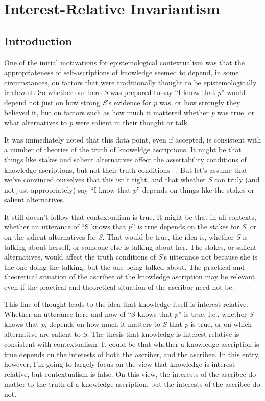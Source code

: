 \chapter{Interest-Relative Invariantism}

\section{Introduction}
\label{introduction}

One of the initial motivations for epistemological contextualism was that the appropriateness of self-ascriptions of knowledge seemed to depend, in some circumstances, on factors that were traditionally thought to be epistemologically irrelevant. So whether our hero \emph{S} was prepared to say ``I know that \emph{p}'' would depend not just on how strong \emph{S}'s evidence for \emph{p} was, or how strongly they believed it, but on factors such as how much it mattered whether \emph{p} was true, or what alternatives to \emph{p} were salient in their thought or talk.

It was immediately noted that this data point, even if accepted, is consistent with a number of theories of the truth of knoweldge ascriptions. It might be that things like stakes and salient alternatives affect the assertability conditions of knowledge ascriptions, but not their truth conditions ~\citep{Rysiew2016}. But let's assume that we've convinced ourselves that this isn't right, and that whether \emph{S} can truly (and not just appropriately) say ``I know that \emph{p}'' depends on things like the stakes or salient alternatives.

It still doesn't follow that contextualism is true. It might be that in all contexts, whether an utterance of ``S knows that \emph{p}'' is true depends on the stakes for \emph{S}, or on the salient alternatives for \emph{S}. That would be true, the idea is, whether \emph{S} is talking about herself, or someone else is talking about her. The stakes, or salient alternatives, would affect the truth conditions of \emph{S}'s utterance not because she is the one doing the talking, but the one being talked about. The practical and theoretical situation of the ascribee of the knowledge ascription may be relevant, even if the practical and theoretical situation of the ascribor need not be.

This line of thought leads to the idea that knowledge itself is interest-relative. Whether an utterance here and now of ``S knows that \emph{p}'' is true, i.e., whether \emph{S} knows that \emph{p}, depends on how much it matters to \emph{S} that \emph{p} is true, or on which alternative are salient to \emph{S}. The thesis that knowledge is interest-relative is consistent with contextualism. It could be that whether a knowledge ascription is true depends on the interests of both the ascriber, and the ascribee. In this entry, however, I'm going to largely focus on the view that knowledge is interest-relative, but contextualism is false. On this view, the interests of the ascribee do matter to the truth of a knowledge ascription, but the interests of the ascribee do not.

